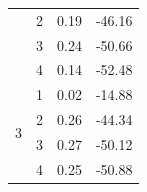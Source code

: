 \begin{table}[H]
\begin{tabular}{|c|c|l|l|}
                                                                               & 2                                                                            & 0.19                                                                             & -46.16                                                                           \\ \cline{2-4} 
                                                                               & 3                                                                            & 0.24                                                                             & -50.66                                                                           \\ \cline{2-4} 
                                                                               & 4                                                                            & 0.14                                                                             & -52.48                                                                           \\ \hline
  \multirow{4}{*}{3}                                                           & 1                                                                            & 0.02                                                                             & -14.88                                                                           \\ \cline{2-4} 
                                                                               & 2                                                                            & 0.26                                                                             & -44.34                                                                           \\ \cline{2-4} 
                                                                               & 3                                                                            & 0.27                                                                             & -50.12                                                                           \\ \cline{2-4} 
                                                                               & 4                                                                            & 0.25                                                                             & -50.88                                                                           \\ \hline

\end{tabular}
\end{table}
